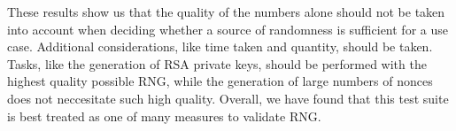 \documentclass[11pt,letterpaper,conference]{IEEEtran}
\begin{document}
These results show us that the quality of the numbers alone should not be taken into account when
deciding whether a source of randomness is sufficient for a use case. Additional considerations,
like time taken and quantity, should be taken. Tasks, like the generation of RSA private keys,
should be performed with the highest quality possible RNG, while the generation of large numbers
of nonces does not neccesitate such high quality. Overall, we have found that this test suite is
best treated as one of many measures to validate RNG.

\printbibliography[heading=bibintoc, title={References}]
\end{document}
